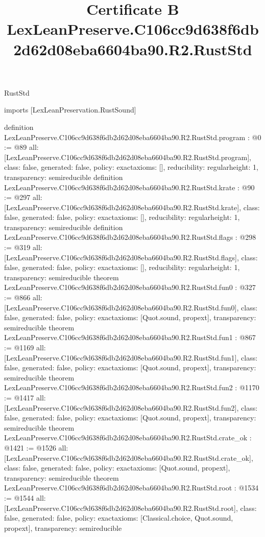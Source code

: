 \begin{lexlean}{RustStd}
\title{Certificate B LexLeanPreserve.C106cc9d638f6db2d62d08eba6604ba90.R2.RustStd}
\begin{coremodule}
imports [LexLeanPreservation.RustSound]

definition LexLeanPreserve.C106cc9d638f6db2d62d08eba6604ba90.R2.RustStd.program : @0 := @89 {
  all: [LexLeanPreserve.C106cc9d638f6db2d62d08eba6604ba90.R2.RustStd.program],
  class: false,
  generated: false,
  policy: exact{axioms: []},
  reducibility: regular{height: 1},
  transparency: semireducible
}
definition LexLeanPreserve.C106cc9d638f6db2d62d08eba6604ba90.R2.RustStd.krate : @90 := @297 {
  all: [LexLeanPreserve.C106cc9d638f6db2d62d08eba6604ba90.R2.RustStd.krate],
  class: false,
  generated: false,
  policy: exact{axioms: []},
  reducibility: regular{height: 1},
  transparency: semireducible
}
definition LexLeanPreserve.C106cc9d638f6db2d62d08eba6604ba90.R2.RustStd.flags : @298 := @319 {
  all: [LexLeanPreserve.C106cc9d638f6db2d62d08eba6604ba90.R2.RustStd.flags],
  class: false,
  generated: false,
  policy: exact{axioms: []},
  reducibility: regular{height: 1},
  transparency: semireducible
}
theorem LexLeanPreserve.C106cc9d638f6db2d62d08eba6604ba90.R2.RustStd.fun0 : @327 := @866 {
  all: [LexLeanPreserve.C106cc9d638f6db2d62d08eba6604ba90.R2.RustStd.fun0],
  class: false,
  generated: false,
  policy: exact{axioms: [Quot.sound, propext]},
  transparency: semireducible
}
theorem LexLeanPreserve.C106cc9d638f6db2d62d08eba6604ba90.R2.RustStd.fun1 : @867 := @1169 {
  all: [LexLeanPreserve.C106cc9d638f6db2d62d08eba6604ba90.R2.RustStd.fun1],
  class: false,
  generated: false,
  policy: exact{axioms: [Quot.sound, propext]},
  transparency: semireducible
}
theorem LexLeanPreserve.C106cc9d638f6db2d62d08eba6604ba90.R2.RustStd.fun2 : @1170 := @1417 {
  all: [LexLeanPreserve.C106cc9d638f6db2d62d08eba6604ba90.R2.RustStd.fun2],
  class: false,
  generated: false,
  policy: exact{axioms: [Quot.sound, propext]},
  transparency: semireducible
}
theorem LexLeanPreserve.C106cc9d638f6db2d62d08eba6604ba90.R2.RustStd.crate_ok : @1421 := @1526 {
  all: [LexLeanPreserve.C106cc9d638f6db2d62d08eba6604ba90.R2.RustStd.crate_ok],
  class: false,
  generated: false,
  policy: exact{axioms: [Quot.sound, propext]},
  transparency: semireducible
}
theorem LexLeanPreserve.C106cc9d638f6db2d62d08eba6604ba90.R2.RustStd.root : @1534 := @1544 {
  all: [LexLeanPreserve.C106cc9d638f6db2d62d08eba6604ba90.R2.RustStd.root],
  class: false,
  generated: false,
  policy: exact{axioms: [Classical.choice, Quot.sound, propext]},
  transparency: semireducible
}


\end{coremodule}
\end{lexlean}
